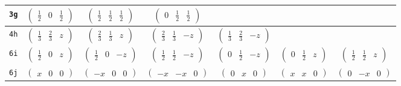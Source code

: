 \documentclass[fleqn,9pt,landscape]{jsarticle}
\begin{document}
\begin{center}
\begin{longtable}{ccccccc}
{\tt 3g} & $ \begin{pmatrix} \frac{1}{2} & 0 & \frac{1}{2} \end{pmatrix} $ & $ \begin{pmatrix} \frac{1}{2} & \frac{1}{2} & \frac{1}{2} \end{pmatrix} $ & $ \begin{pmatrix} 0 & \frac{1}{2} & \frac{1}{2} \end{pmatrix} $ & $  $ & $  $ & $  $ \\ \hline
{\tt 4h} & $ \begin{pmatrix} \frac{1}{3} & \frac{2}{3} & z \end{pmatrix} $ & $ \begin{pmatrix} \frac{2}{3} & \frac{1}{3} & z \end{pmatrix} $ & $ \begin{pmatrix} \frac{2}{3} & \frac{1}{3} & - z \end{pmatrix} $ & $ \begin{pmatrix} \frac{1}{3} & \frac{2}{3} & - z \end{pmatrix} $ & $  $ & $  $ \\ \hline
{\tt 6i} & $ \begin{pmatrix} \frac{1}{2} & 0 & z \end{pmatrix} $ & $ \begin{pmatrix} \frac{1}{2} & 0 & - z \end{pmatrix} $ & $ \begin{pmatrix} \frac{1}{2} & \frac{1}{2} & - z \end{pmatrix} $ & $ \begin{pmatrix} 0 & \frac{1}{2} & - z \end{pmatrix} $ & $ \begin{pmatrix} 0 & \frac{1}{2} & z \end{pmatrix} $ & $ \begin{pmatrix} \frac{1}{2} & \frac{1}{2} & z \end{pmatrix} $ \\ \hline
{\tt 6j} & $ \begin{pmatrix} x & 0 & 0 \end{pmatrix} $ & $ \begin{pmatrix} - x & 0 & 0 \end{pmatrix} $ & $ \begin{pmatrix} - x & - x & 0 \end{pmatrix} $ & $ \begin{pmatrix} 0 & x & 0 \end{pmatrix} $ & $ \begin{pmatrix} x & x & 0 \end{pmatrix} $ & $ \begin{pmatrix} 0 & - x & 0 \end{pmatrix} $ \\ \hline

\end{longtable}
\end{center}
\end{document}

